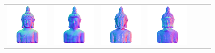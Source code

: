 \begin{figure}
\begin{tabular*}{\linewidth}{@{}c@{}c@{}c@{}c@{}c@{}c@{}c@{}}
\includegraphics[width=\reswidth\linewidth]{figures/results/examples/gt_buddha_normals.png} &
\includegraphics[width=\reswidth\linewidth]{figures/results/examples/ours_buddha_normals.png} &
\includegraphics[width=\reswidth\linewidth]{figures/results/examples/jung_buddha_normals.png} &
\includegraphics[width=\reswidth\linewidth]{figures/results/examples/yu_buddha_normals.png} &

\end{tabular*}
\end{figure}
